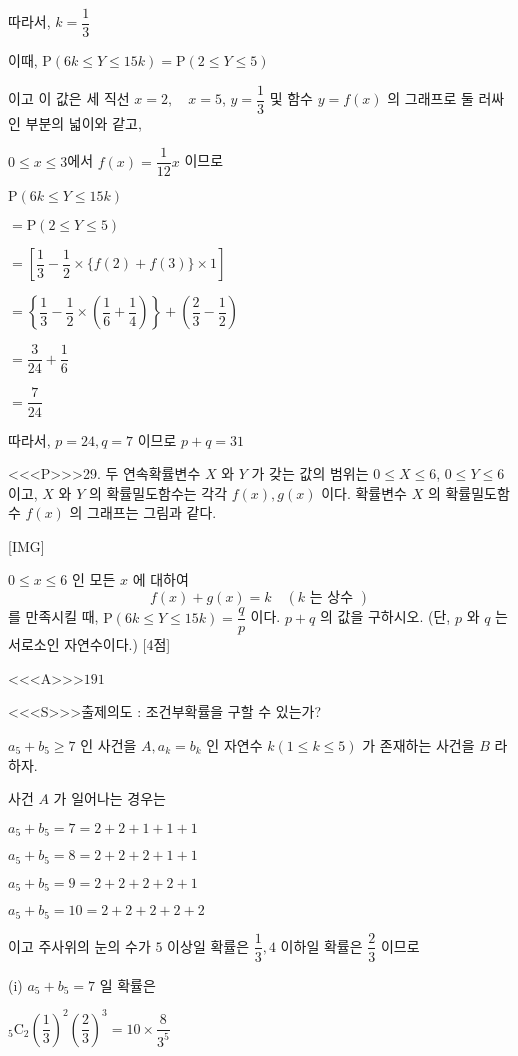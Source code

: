 \documentclass{oblivoir}
\begin{document}
따라서, $k=\dfrac{1}{3}$

이때, $\mathrm{P}(6 k \leq Y \leq 15 k)=\mathrm{P}(2 \leq Y \leq 5)$

이고 이 값은 세 직선 $x=2, \quad x=5$, $y=\dfrac{1}{3}$ 및 함수 $y=f(x)$ 의 그래프로 둘
러싸인 부분의 넓이와 같고,

$0 \leq x \leq 3$에서 $f(x)=\dfrac{1}{12} x$ 이므로

$\mathrm{P}(6 k \leq Y \leq 15 k)$

$=\mathrm{P}(2 \leq Y \leq 5)$

$=\left[\dfrac{1}{3}-\dfrac{1}{2} \times\{f(2)+f(3)\} \times 1\right]$

$=\left\{\dfrac{1}{3}-\dfrac{1}{2} \times\left(\dfrac{1}{6}+\dfrac{1}{4}\right)\right\}+\left(\dfrac{2}{3}-\dfrac{1}{2}\right)$

$=\dfrac{3}{24}+\dfrac{1}{6}$

$=\dfrac{7}{24}$

따라서, $p=24, q=7$ 이므로 $p+q=31$


<<<P>>>29. 두 연속확률변수 $X$ 와 $Y$ 가 갖는 값의 범위는 $0 \leq X \leq 6$, $0 \leq Y \leq 6$ 이고, $X$ 와 $Y$ 의 확률밀도함수는 각각 $f(x), g(x)$ 이다. 확률변수 $X$ 의 확률밀도함수 $f(x)$ 의 그래프는 그림과 같다.

[IMG]

$0 \leq x \leq 6$ 인 모든 $x$ 에 대하여
$$
f(x)+g(x)=k \quad(k \text { 는 상수 })
$$
를 만족시킬 때, $\mathrm{P}(6 k \leq Y \leq 15 k)=\dfrac{q}{p}$ 이다. $p+q$ 의 값을 구하시오. (단, $p$ 와 $q$ 는 서로소인 자연수이다.) [4점]


<<<A>>>$191$

<<<S>>>출제의도 : 조건부확률을 구할 수 있는가?

$a_{5}+b_{5} \geq 7$ 인 사건을 $A, a_{k}=b_{k}$ 인 자연수 $k(1 \leq k \leq 5)$ 가 존재하는 사건을 $B$ 라 하자.

사건 $A$ 가 일어나는 경우는

$a_{5}+b_{5}=7=2+2+1+1+1$

$a_{5}+b_{5}=8=2+2+2+1+1$

$a_{5}+b_{5}=9=2+2+2+2+1$

$a_{5}+b_{5}=10=2+2+2+2+2$

이고 주사위의 눈의 수가 $5$ 이상일 확률은 $\dfrac{1}{3}, 4$ 이하일 확률은 $\dfrac{2}{3}$ 이므로

(i) $a_{5}+b_{5}=7$ 일 확률은

${ }_{5} \mathrm{C}_{2}\left(\dfrac{1}{3}\right)^{2}\left(\dfrac{2}{3}\right)^{3}=10 \times \dfrac{8}{3^{5}}$
\end{document}
